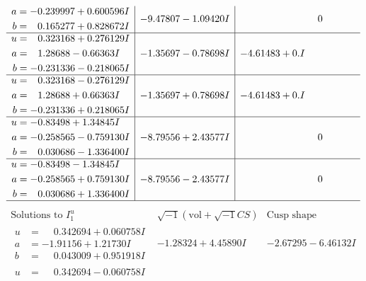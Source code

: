 \documentclass[1p]{elsarticle_modified}
\theoremstyle{definition}
\newcommand{\I}{\sqrt{-1}}
\begin{document}
$$\begin{array}{c|c|c}
\begin{aligned}
a &= -0.239997 + 0.600596 I \\
b &= \phantom{-}0.165277 + 0.828672 I\end{aligned}
 & -9.47807 - 1.09420 I & \phantom{-0.000000 } 0 \\ \hline\begin{aligned}
u &= \phantom{-}0.323168 + 0.276129 I \\
a &= \phantom{-}1.28688 - 0.66363 I \\
b &= -0.231336 - 0.218065 I\end{aligned}
 & -1.35697 - 0.78698 I & -4.61483 + 0. I\phantom{ +0.000000I} \\ \hline\begin{aligned}
u &= \phantom{-}0.323168 - 0.276129 I \\
a &= \phantom{-}1.28688 + 0.66363 I \\
b &= -0.231336 + 0.218065 I\end{aligned}
 & -1.35697 + 0.78698 I & -4.61483 + 0. I\phantom{ +0.000000I} \\ \hline\begin{aligned}
u &= -0.83498 + 1.34845 I \\
a &= -0.258565 - 0.759130 I \\
b &= \phantom{-}0.030686 - 1.336400 I\end{aligned}
 & -8.79556 + 2.43577 I & \phantom{-0.000000 } 0 \\ \hline\begin{aligned}
u &= -0.83498 - 1.34845 I \\
a &= -0.258565 + 0.759130 I \\
b &= \phantom{-}0.030686 + 1.336400 I\end{aligned}
 & -8.79556 - 2.43577 I & \phantom{-0.000000 } 0\\
 \hline 
 \end{array}$$\newpage$$\begin{array}{c|c|c}  
\text{Solutions to }I^u_{1}& \I (\text{vol} + \sqrt{-1}CS) & \text{Cusp shape}\\
 \hline 
\begin{aligned}
u &= \phantom{-}0.342694 + 0.060758 I \\
a &= -1.91156 + 1.21730 I \\
b &= \phantom{-}0.043009 + 0.951918 I\end{aligned}
 & -1.28324 + 4.45890 I & -2.67295 - 6.46132 I \\ \hline\begin{aligned}
u &= \phantom{-}0.342694 - 0.060758 I \\

\end{aligned}
\end{array}$$
\end{document}
